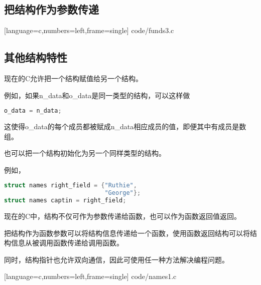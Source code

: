 \subsection{把结构作为参数传递}
\begin{frame}\ft{\subsecname}

[language=c,numbers=left,frame=single]  
{code/funds3.c}
\end{frame}


\subsection{其他结构特性}
\begin{frame}[fragile]\ft{\subsecname}
\textcolor{acolor1}{现在的C允许把一个结构赋值给另一个结构。} \vspace{0.1in}

例如，如果{\tf n\_data}和{\tf o\_data}是同一类型的结构，可以这样做
\begin{lstlisting}[language=c,backgroundcolor=\color{red!20}]
o_data = n_data;
\end{lstlisting}
这使得{\tf o\_data}的每个成员都被赋成{\tf n\_data}相应成员的值，即便其中有成员是数组。
\end{frame}

\begin{frame}[fragile]\ft{\subsecname}
\textcolor{acolor1}{也可以把一个结构初始化为另一个同样类型的结构。} \vspace{0.1in}

例如， 
\begin{lstlisting}[language=c,backgroundcolor=\color{red!20}]
struct names right_field = {"Ruthie", 
                            "George"};
struct names captin = right_field;
\end{lstlisting}
\end{frame}

\begin{frame}[fragile]\ft{\subsecname}
\textcolor{acolor1}{现在的C中，结构不仅可作为参数传递给函数，也可以作为函数返回值返回。} \vspace{0.1in}

把结构作为函数参数可以将结构信息传递给一个函数，使用函数返回结构可以将结构信息从被调用函数传递给调用函数。\vspace{0.1in}

同时，结构指针也允许双向通信，因此可使用任一种方法解决编程问题。

\end{frame}

\begin{frame}\ft{\subsecname}

[language=c,numbers=left,frame=single]  
{code/names1.c}
\end{frame}



